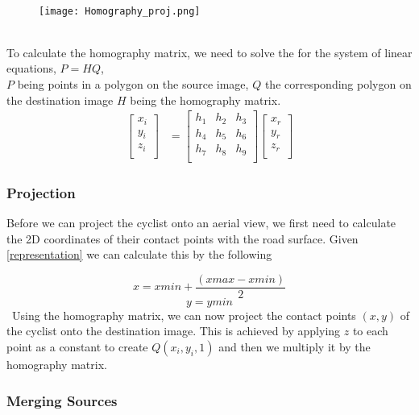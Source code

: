 \ \\ 
\begin{figure}[h]
  \texttt{[image: Homography\_proj.png]}
  \centering 
  \end{figure}
  \label{homography}
\ \\ 
To calculate the homography matrix, we need to solve the for the system of linear equations, $P = HQ$,
\ \\
$P$ being points in a polygon on the source image, $Q$ the corresponding polygon on the destination image $H$ being the homography matrix.
\begin{align}
\label{eq:3}
  \begin{bmatrix}
    x_{i} \\
    y_{i} \\
    z_{i} \\
  \end{bmatrix}
  &= \begin{bmatrix}
      h_1 & h_2 & h_3 \\
      h_4 & h_5 & h_6 \\
      h_7 & h_8 & h_9 \\
  \end{bmatrix}
  \begin{bmatrix}
    x_{r} \\
    y_{r} \\
    z_{r} \\
  \end{bmatrix}
\end{align}

\subsubsection{Projection}

Before we can project the cyclist onto an aerial view, we first need to calculate the 2D coordinates of their contact points with the road surface.
Given \ref{representation} we can calculate this by the following

$$x = xmin + \frac{(xmax - xmin)}{2}$$
$$y = ymin$$
\
Using the homography matrix, we can now project the contact points $(x, y)$ of the cyclist onto the destination
image. This is achieved by applying $z$ to each point as a constant to create $Q(x_i, y_i, 1)$ and then we multiply it by the homography matrix. 

\subsubsection{Merging Sources}

